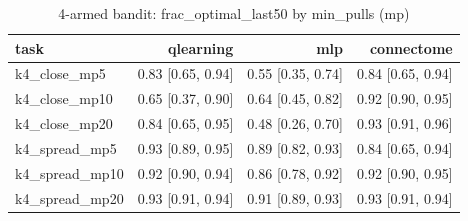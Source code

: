 \begin{table}[t]
\centering
\small
\begin{tabular}{lrrr}
\toprule
task & qlearning & mlp & connectome \\
\midrule
k4\_close\_mp5 & 0.83 [0.65, 0.94] & 0.55 [0.35, 0.74] & 0.84 [0.65, 0.94] \\
k4\_close\_mp10 & 0.65 [0.37, 0.90] & 0.64 [0.45, 0.82] & 0.92 [0.90, 0.95] \\
k4\_close\_mp20 & 0.84 [0.65, 0.95] & 0.48 [0.26, 0.70] & 0.93 [0.91, 0.96] \\
k4\_spread\_mp5 & 0.93 [0.89, 0.95] & 0.89 [0.82, 0.93] & 0.84 [0.65, 0.94] \\
k4\_spread\_mp10 & 0.92 [0.90, 0.94] & 0.86 [0.78, 0.92] & 0.92 [0.90, 0.95] \\
k4\_spread\_mp20 & 0.93 [0.91, 0.94] & 0.91 [0.89, 0.93] & 0.93 [0.91, 0.94] \\
\bottomrule
\end{tabular}
\caption{4-armed bandit: frac\_optimal\_last50 by min\_pulls (mp)}
\label{tab:bandit_multi_frac_optimal_last50}
\end{table}